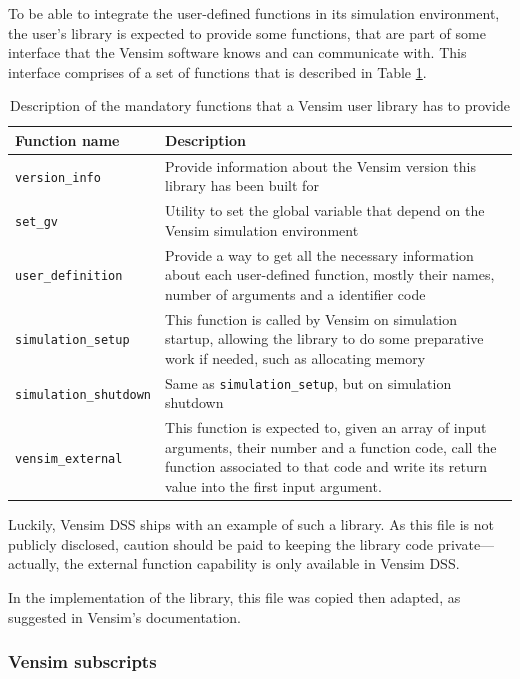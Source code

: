 To be able to integrate the user-defined functions in its simulation environment, the user's library is expected to provide some functions, that are part of some interface that the Vensim software knows and can communicate with. This interface comprises of a set of functions that is described in Table \ref{table:vensim-interface}.
\begin{table}[h]
    \centering
    \begin{tabular}{|m{4.1cm}|m{12cm}|}
        \hline
        Function name & Description \\ \hline
        \texttt{version\_info} & Provide information about the Vensim version this library has been built for \\
        \texttt{set\_gv} & Utility to set the global variable that depend on the Vensim simulation environment \\
        \texttt{user\_definition} & Provide a way to get all the necessary information about each user-defined function, mostly their names, number of arguments and a identifier code \\
        \texttt{simulation\_setup} & This function is called by Vensim on simulation startup, allowing the library to do some preparative work if needed, such as allocating memory \\
        \texttt{simulation\_shutdown} & Same as \texttt{simulation\_setup}, but on simulation shutdown \\
        \texttt{vensim\_external} & This function is expected to, given an array of input arguments, their number and a function code, call the function associated to that code and write its return value into the first input argument.\\
        \hline
    \end{tabular}
    \caption{Description of the mandatory functions that a Vensim user library has to provide}
    \label{table:vensim-interface}
\end{table}

Luckily, %
Vensim DSS ships with an example of such a library. As this file is not publicly disclosed, caution should be paid to keeping the library code private---actually, the external function capability is only available in Vensim DSS.

In the implementation of the library, this file was copied then adapted, as suggested in Vensim's documentation.

\subsubsection{Vensim subscripts}

